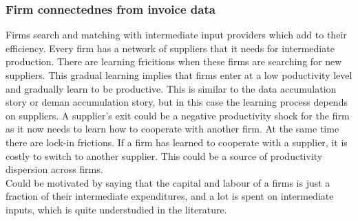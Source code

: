 \documentclass[12pt]{article}
\begin{document}
\subsubsection*{Firm connectednes from invoice data}

Firms search and matching with intermediate input providers which add to their efficiency. Every firm has a network of suppliers that it needs for intermediate production. There are learning fricitions when these firms are searching for new suppliers. This gradual learning implies that firms enter at a low poductivity level and gradually learn to be productive. This is similar to the data accumulation story or deman accumulation story, but in this case the learning process depends on suppliers. A supplier's exit could be a negative productivity shock for the firm as it now needs to learn how to cooperate with another firm. At the same time there are lock-in frictions. If a firm has learned to cooperate with a supplier, it is costly to switch to another supplier. This could be a source of productivity dispersion across firms. \\
Could be motivated by saying that the capital and labour of a firms is just a fraction of their intermediate expenditures, and a lot is spent on intermediate inputs, which is quite understudied in the literature. 
\end{document}
